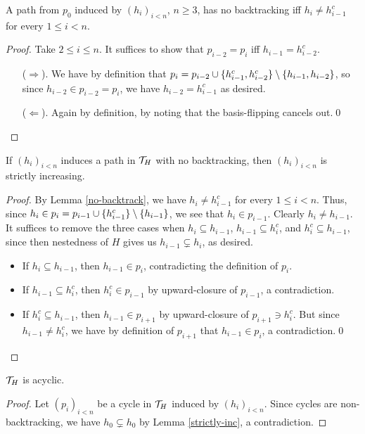 \documentclass{amsart}
\begin{document}
    \begin{lemma}\label{no-backtrack}
        A path from $p_0$ induced by $(h_i)_{i<n}$, $n\geq3$, has no backtracking iff $h_i\neq h_{i-1}^c$ for every $1\leq i<n$.
    \end{lemma}
    \begin{proof}
        Take $2\leq i\leq n$. It suffices to show that $p_{i-2}=p_i$ iff $h_{i-1}=h_{i-2}^c$.
        \begin{itemize}
            \item[($\Rightarrow$).] We have by definition that $p_i=p_{i-2}\cup\{h_{i-1}^c,h_{i-2}^c\}\setminus\left\{h_{i-1},h_{i-2}\right\}$, so since $h_{i-2}\in p_{i-2}=p_i$, we have $h_{i-2}=h_{i-1}^c$ as desired.
            \item[($\Leftarrow$).] Again by definition, by noting that the basis-flipping cancels out.\qed
        \end{itemize}
    \end{proof}

    \begin{lemma}\label{strictly-inc}
        If $(h_i)_{i<n}$ induces a path in $\mathcal{T}_H$ with no backtracking, then $(h_i)_{i<n}$ is strictly increasing.
    \end{lemma}
    \begin{proof}
        By Lemma \ref{no-backtrack}, we have $h_i\neq h_{i-1}^c$ for every $1\leq i<n$. Thus, since $h_i\in p_i=p_{i-1}\cup\{h_{i-1}^c\}\setminus\left\{h_{i-1}\right\}$, we see that $h_i\in p_{i-1}$. Clearly $h_i\neq h_{i-1}$. It suffices to remove the three cases when $h_i\subseteq h_{i-1}$, $h_{i-1}\subseteq h_i^c$, and $h_i^c\subseteq h_{i-1}$, since then nestedness of $H$ gives us $h_{i-1}\subsetneq h_i$, as desired.
        \begin{itemize}
            \item If $h_i\subseteq h_{i-1}$, then $h_{i-1}\in p_i$, contradicting the definition of $p_i$.
            \item If $h_{i-1}\subseteq h_i^c$, then $h_i^c\in p_{i-1}$ by upward-closure of $p_{i-1}$, a contradiction.
            \item If $h_i^c\subseteq h_{i-1}$, then $h_{i-1}\in p_{i+1}$ by upward-closure of $p_{i+1}\ni h_i^c$. But since $h_{i-1}\neq h_i^c$, we have by definition of $p_{i+1}$ that $h_{i-1}\in p_i$, a contradiction.\qed
        \end{itemize}
    \end{proof}

    \begin{proposition}\label{acyclic}
        $\mathcal{T}_H$ is acyclic.
    \end{proposition}
    \begin{proof}
        Let $(p_i)_{i<n}$ be a cycle in $\mathcal{T}_H$ induced by $(h_i)_{i<n}$. Since cycles are non-backtracking, we have $h_0\subsetneq h_0$ by Lemma \ref{strictly-inc}, a contradiction.
    \end{proof}
\end{document}
